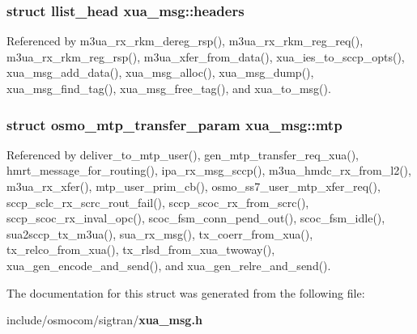 \subsubsection[{headers}]{\setlength{\rightskip}{0pt plus 5cm}struct llist\+\_\+head xua\+\_\+msg\+::headers}\label{structxua__msg_ac3fa690aa3dbafa71c41f25c17b6dd30}


Referenced by m3ua\+\_\+rx\+\_\+rkm\+\_\+dereg\+\_\+rsp(), m3ua\+\_\+rx\+\_\+rkm\+\_\+reg\+\_\+req(), m3ua\+\_\+rx\+\_\+rkm\+\_\+reg\+\_\+rsp(), m3ua\+\_\+xfer\+\_\+from\+\_\+data(), xua\+\_\+ies\+\_\+to\+\_\+sccp\+\_\+opts(), xua\+\_\+msg\+\_\+add\+\_\+data(), xua\+\_\+msg\+\_\+alloc(), xua\+\_\+msg\+\_\+dump(), xua\+\_\+msg\+\_\+find\+\_\+tag(), xua\+\_\+msg\+\_\+free\+\_\+tag(), and xua\+\_\+to\+\_\+msg().

\subsubsection[{mtp}]{\setlength{\rightskip}{0pt plus 5cm}struct {\bf osmo\+\_\+mtp\+\_\+transfer\+\_\+param} xua\+\_\+msg\+::mtp}\label{structxua__msg_a2c486e653d546de369103ad727a4e292}


Referenced by deliver\+\_\+to\+\_\+mtp\+\_\+user(), gen\+\_\+mtp\+\_\+transfer\+\_\+req\+\_\+xua(), hmrt\+\_\+message\+\_\+for\+\_\+routing(), ipa\+\_\+rx\+\_\+msg\+\_\+sccp(), m3ua\+\_\+hmdc\+\_\+rx\+\_\+from\+\_\+l2(), m3ua\+\_\+rx\+\_\+xfer(), mtp\+\_\+user\+\_\+prim\+\_\+cb(), osmo\+\_\+ss7\+\_\+user\+\_\+mtp\+\_\+xfer\+\_\+req(), sccp\+\_\+sclc\+\_\+rx\+\_\+scrc\+\_\+rout\+\_\+fail(), sccp\+\_\+scoc\+\_\+rx\+\_\+from\+\_\+scrc(), sccp\+\_\+scoc\+\_\+rx\+\_\+inval\+\_\+opc(), scoc\+\_\+fsm\+\_\+conn\+\_\+pend\+\_\+out(), scoc\+\_\+fsm\+\_\+idle(), sua2sccp\+\_\+tx\+\_\+m3ua(), sua\+\_\+rx\+\_\+msg(), tx\+\_\+coerr\+\_\+from\+\_\+xua(), tx\+\_\+relco\+\_\+from\+\_\+xua(), tx\+\_\+rlsd\+\_\+from\+\_\+xua\+\_\+twoway(), xua\+\_\+gen\+\_\+encode\+\_\+and\+\_\+send(), and xua\+\_\+gen\+\_\+relre\+\_\+and\+\_\+send().



The documentation for this struct was generated from the following file\+:\begin{DoxyCompactItemize}
\item 
include/osmocom/sigtran/{\bf xua\+\_\+msg.\+h}\end{DoxyCompactItemize}
